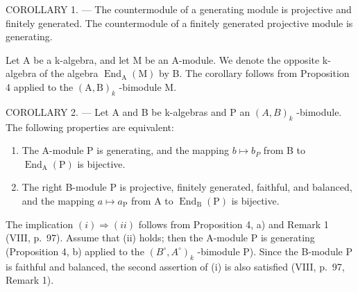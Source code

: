 COROLLARY 1. --- The countermodule of a generating module is projective and finitely generated. The countermodule of a finitely generated projective module is generating.

Let A be a k-algebra, and let M be an A-module. We denote the opposite k-algebra of the algebra \(\operatorname{End}_{\mathrm{A}}(\mathrm{M})\) by B. The corollary follows from Proposition 4 applied to the \((\mathrm{A},\mathrm{B})_{k}\) -bimodule M.

COROLLARY 2. --- Let A and B be k-algebras and P an \((A,B)_{k}\) -bimodule. The following properties are equivalent:

\begin{enumerate}
\def\labelenumi{(\roman{enumi})}
\item
  The A-module P is generating, and the mapping \(b \mapsto b_{P}\) from B to \(\operatorname{End}_{\mathrm{A}}(\mathrm{P})\) is bijective.
\item
  The right B-module P is projective, finitely generated, faithful, and balanced, and the mapping \(a \mapsto a_{\mathrm{P}}\) from A to \(\operatorname{End}_{\mathrm{B}}(\mathrm{P})\) is bijective.
\end{enumerate}

The implication \((i) \Rightarrow (ii)\) follows from Proposition 4, a) and Remark 1 (VIII, p.~97). Assume that (ii) holds; then the A-module P is generating (Proposition 4, b) applied to the \((B^{\circ}, A^{\circ})_{k}\) -bimodule P). Since the B-module P is faithful and balanced, the second assertion of (i) is also satisfied (VIII, p.~97, Remark 1).

